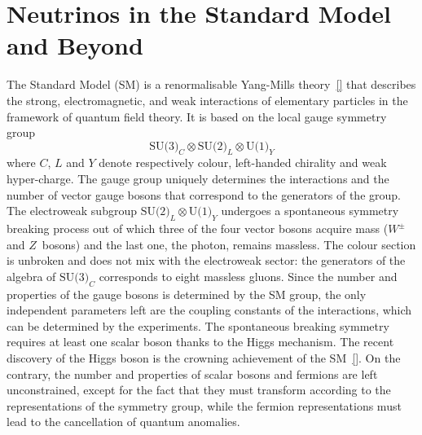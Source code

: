 
\clearpage
\chapter{Neutrinos in the Standard Model and Beyond}
\label{cha:intro}

The Standard Model (SM) is a renormalisable Yang-Mills theory~\ref{} that describes the strong, electromagnetic, and weak interactions %
of elementary particles in the framework of quantum field theory.
It is based on the local gauge symmetry group 
\begin{equation}
	\label{eq:smgroup}
	\text{SU(3)}_C \otimes \text{SU(2)}_L \otimes \text{U(1)}_Y
\end{equation}
where $C$, $L$ and $Y$ denote respectively colour, left-handed chirality and weak hyper-charge.
The gauge group uniquely determines the interactions and the number of %
vector gauge bosons that correspond to the generators of the group.
%
The electroweak subgroup $\text{SU(2)}_L \otimes \text{U(1)}_Y$ undergoes a spontaneous symmetry breaking process %
out of which three of the four vector bosons acquire mass ($W^\pm$ and $Z$~bosons) and the last one, the photon, remains massless.
The colour section is unbroken and does not mix with the electroweak sector: %
the generators of the algebra of $\text{SU(3)}_C$ corresponds to eight massless gluons.
%
Since the number and properties of the gauge bosons is determined by the SM group, %
the only independent parameters left are the coupling constants of the interactions, which can be determined by the experiments.
The spontaneous breaking symmetry requires at least one scalar boson thanks to the Higgs mechanism.
The recent discovery of the Higgs boson is the crowning achievement of the SM~\ref{}.
On the contrary, the number and properties of scalar bosons and fermions are left unconstrained, %
except for the fact that they must transform according to the representations of the symmetry group, %
while the fermion representations must lead to the cancellation of quantum anomalies.

